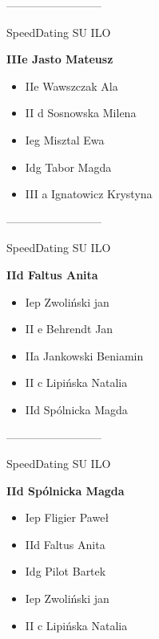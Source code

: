 \documentclass[a4paper,10pt]{article}
\begin{document}
\begin{multicols}{3}
\begin{minipage}[l]{\textwidth}
--------------------------

  \footnotesize{SpeedDating SU ILO}

  \bfseries{IIIe Jasto Mateusz}

  \begin{itemize}
    \item IIe Wawszczak Ala
    \item II d Sosnowska Milena
    \item Ieg Misztal Ewa
    \item Idg Tabor Magda
    \item III a Ignatowicz Krystyna

    \end{itemize}



\end{minipage}



\begin{minipage}[l]{\textwidth}
--------------------------

  \footnotesize{SpeedDating SU ILO}

  \bfseries{IId Faltus Anita}

  \begin{itemize}
    \item Iep Zwoliński jan
    \item II e Behrendt Jan
    \item IIa Jankowski Beniamin
    \item II c Lipińska Natalia
    \item IId  Spólnicka Magda

    \end{itemize}



\end{minipage}



\begin{minipage}[l]{\textwidth}
--------------------------

  \footnotesize{SpeedDating SU ILO}

  \bfseries{IId  Spólnicka Magda}

  \begin{itemize}
    \item Iep Fligier Paweł
    \item IId Faltus Anita
    \item Idg Pilot Bartek
    \item Iep Zwoliński jan
    \item II c Lipińska Natalia


\end{itemize}
\end{minipage}
\end{multicols}
\end{document}
